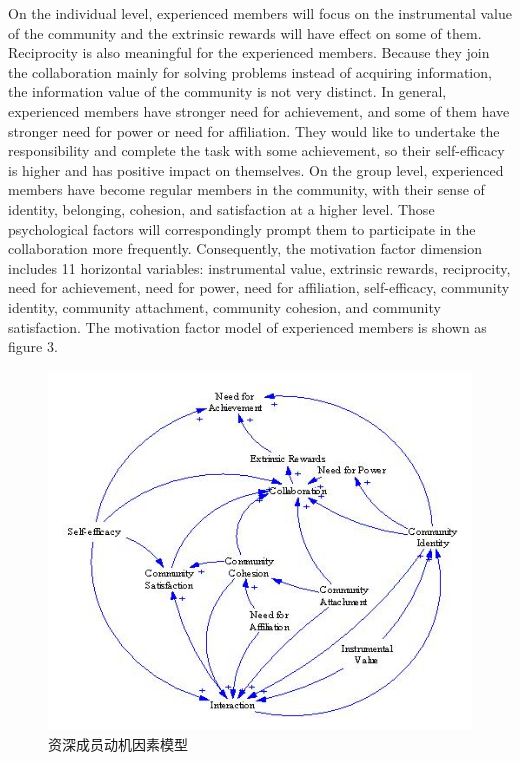 \documentclass{elsarticle}
\begin{document}
   On the individual level, experienced members will focus on the
   instrumental value of the community and the extrinsic rewards will
   have effect on some of them. Reciprocity is also meaningful for the
   experienced members. Because they join the collaboration mainly for
   solving problems instead of acquiring information, the information
   value of the community is not very distinct. In general,
   experienced members have stronger need for achievement, and some of
   them have stronger need for power or need for affiliation. They
   would like to undertake the responsibility and complete the task
   with some achievement, so their self-efficacy is higher and has
   positive impact on themselves. On the group level, experienced
   members have become regular members in the community, with their
   sense of identity, belonging, cohesion, and satisfaction at a
   higher level. Those psychological factors will correspondingly
   prompt them to participate in the collaboration more
   frequently. Consequently, the motivation factor dimension includes
   11 horizontal variables: instrumental value, extrinsic rewards,
   reciprocity, need for achievement, need for power, need for
   affiliation, self-efficacy, community identity, community
   attachment, community cohesion, and community satisfaction. The
   motivation factor model of experienced members is shown as figure
   3.
\begin{figure}[htpb]
  \centering
  \label{fig:senior member}
  \includegraphics{03}
  \caption{资深成员动机因素模型}
\end{figure}
\end{document}
